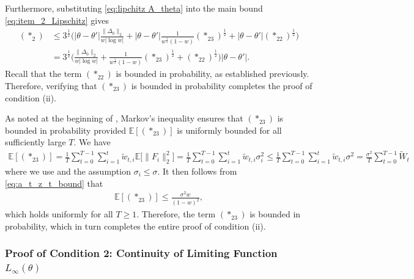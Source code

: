 \documentclass[a4paper, 11pt]{article}
\newcommand{\E}{\mathbb E}
\theoremstyle{definition}
\begin{document}
Furthermore, substituting \eqref{eq:lipchitz A_theta} into the main bound \eqref{eq:item_2_Lipschitz} gives
\begin{align}
    (*_2) & \le 3^{\frac{1}{2}} \Bigg( \big| \theta - \theta' \big| \frac{ \big\| \Delta_0 \big\|_2 }{ w | \log w | } + \left| \theta - \theta' \right| \frac{ 1 }{ w^{\frac{1}{2}} (1 - w) } (*_{23})^{\frac{1}{2}} + \big| \theta - \theta' \big| (*_{22})^{\frac{1}{2}} \Bigg) \\
    & = 3^{\frac{1}{2}}  \Bigg( \frac{ \big\| \Delta_0 \big\|_2 }{ w | \log w | } + \frac{ 1 }{ w^{\frac{1}{2}} (1 - w) } (*_{23})^{\frac{1}{2}} + (*_{22})^{\frac{1}{2}} \Bigg) \big| \theta - \theta' \big| .
\end{align}
Recall that the term $(*_{22})$ is bounded in probability, as established previously.
Therefore, verifying that $(*_{23})$ is bounded in probability completes the proof of condition (ii).

As noted at the beginning of , Markov's inequality ensures that $(*_{23})$ is bounded in probability provided $\E[ (*_{23}) ]$ is uniformly bounded for all sufficiently large $T$.
We have
\begin{align}
    \E[ (*_{23}) ] = \frac{1}{T} \sum_{t=0}^{T-1} \sum_{i=1}^{t} \tilde{w}_{t,i} \E\big[ \| F_i \|_2^2 \big] = \frac{1}{T} \sum_{t=0}^{T-1} \sum_{i=1}^{t} \tilde{w}_{t,i} \sigma_i^2 \le \frac{1}{T} \sum_{t=0}^{T-1} \sum_{i=1}^{t} \tilde{w}_{t,i} \sigma^2 = \frac{\sigma^2}{T} \sum_{t=0}^{T-1} \tilde{W}_{t}
\end{align}
where we use  and the assumption $\sigma_i \le \sigma$.
It then follows from \eqref{eq:a_t_z_t_bound} that
\begin{align}
    \E[ (*_{23}) ] \le \frac{\sigma^2 w}{(1 - w)^2} ,
\end{align}
which holds uniformly for all $T \ge 1$.
Therefore, the term $(*_{23})$ is bounded in probability, which in turn completes the entire proof of condition (ii).



\subsubsection{Proof of Condition 2: Continuity of Limiting Function $L_\infty(\theta)$} \label{apx:limiting_con}
    
\end{document}
